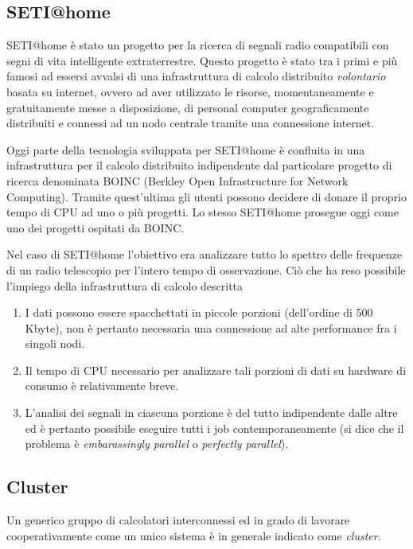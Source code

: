 \subsection{SETI@home}\label{setihome}

SETI@home è stato un progetto per la ricerca di segnali radio
compatibili con segni di vita intelligente extraterrestre. Questo
progetto è stato tra i primi e più famosi ad essersi avvalsi di una
infrastruttura di calcolo distribuito \emph{volontario} basata su
internet, ovvero ad aver utilizzato le risorse, momentaneamente e
gratuitamente messe a disposizione, di personal computer geograficamente
distribuiti e connessi ad un nodo centrale tramite una connessione
internet.

Oggi parte della tecnologia sviluppata per SETI@home è confluita in una
infrastruttura per il calcolo distribuito indipendente dal particolare
progetto di ricerca denominata BOINC (Berkley Open Infrastructure for
Network Computing). Tramite quest'ultima gli utenti possono decidere di
donare il proprio tempo di CPU ad uno o più progetti. Lo stesso
SETI@home prosegue oggi come uno dei progetti ospitati da BOINC.

Nel caso di SETI@home l'obiettivo era analizzare tutto lo spettro delle
frequenze di un radio telescopio per l'intero tempo di osservazione. Ciò
che ha reso possibile l'impiego della infrastruttura di calcolo
descritta

\begin{enumerate}
\def\labelenumi{\arabic{enumi}.}
\tightlist
\item
  I dati possono essere spacchettati in piccole porzioni (dell'ordine di
  500 Kbyte), non è pertanto necessaria una connessione ad alte
  performance fra i singoli nodi.
\item
  Il tempo di CPU necessario per analizzare tali porzioni di dati su
  hardware di consumo è relativamente breve.
\item
  L'analisi dei segnali in ciascuna porzione è del tutto indipendente
  dalle altre ed è pertanto possibile eseguire tutti i job
  contemporaneamente (si dice che il problema è \emph{embarassingly
  parallel} o \emph{perfectly parallel}).
\end{enumerate}

\subsection{Cluster}\label{cluster}

Un generico gruppo di calcolatori interconnessi ed in grado di lavorare
cooperativamente come un unico sistema è in generale indicato come
\emph{cluster}.

